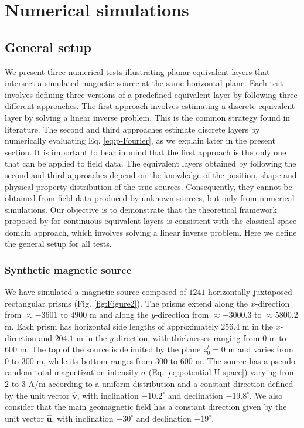 \section{Numerical simulations}
\label{eq:numerical_simulations}

\subsection{General setup}

We present three numerical tests illustrating planar equivalent layers that intersect a simulated 
magnetic source at the same horizontal plane.
Each test involves defining three versions of a predefined equivalent layer by following three different approaches.
The first approach involves estimating a discrete equivalent layer by solving a linear inverse problem. 
This is the common strategy found in literature.
The second and third approaches estimate discrete layers by numerically evaluating Eq. \ref{eq:p-Fourier}, 
as we explain later in the present section. 
It is important to bear in mind that the first approach is the only one that can be applied to field data.
The equivalent layers obtained by following the second and third approaches depend on the knowledge of
the position, shape and physical-property distribution of the true sources. Consequently, they cannot be 
obtained from field data produced by unknown sources, but only from numerical simulations.
Our objective is to demonstrate that the theoretical framework proposed by 
\cite{oliveirajr_etal2026_1}
for continuous equivalent layers is consistent with the classical space-domain approach, which involves 
solving a linear inverse problem. Here we define the general setup for all tests.

\subsubsection{Synthetic magnetic source}

We have simulated a magnetic source composed of $1241$ horizontally juxtaposed rectangular prisms
(Fig. \ref{fig:Figure2}). 
The prisms extend along the $x$-direction from $\approx -3601$ to $4900$ m and 
along the $y$-direction from $\approx -3000.3$ to $\approx 5800.2$ m. 
Each prism has horizontal side lengths of approximately $256.4$ m in the $x$-direction 
and $204.1$ m in the $y$-direction, with thicknesses ranging from $0$ m to $600$ m. 
The top of the source is delimited by the plane $z^{t}_{0} = 0$ m and varies 
from $0$ to $300$ m, while its bottom ranges from $300$ to $600$ m.
The source has a pseudo-random total-magnetization intensity $\sigma$ 
(Eq. \ref{eq:potential-U-space}) 
varying from $2$ to $3$ A/m according to a uniform distribution and a constant direction defined by the 
unit vector $\hat{\mathbf{v}}$, with inclination $-10.2^{\circ}$ and declination $-19.8^{\circ}$. 
We also consider that the main geomagnetic field has a constant direction given by the unit vector $\hat{\mathbf{u}}$,
with inclination $-30^{\circ}$ and declination $-19^{\circ}$. 

